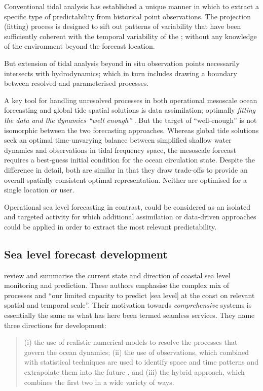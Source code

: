 Conventional tidal analysis has established a unique manner in which to extract a specific type of predictability from historical point observations.
The projection (fitting) process is designed to sift out patterns of variability that have been sufficiently coherent with the temporal variability of the \ATGP{}; without any knowledge of the environment beyond the forecast location.

But extension of tidal analysis beyond in situ observation points necessarily intersects with hydrodynamics; which in turn includes drawing a boundary between resolved and parameterised processes.  

A key tool for handling unresolved processes in both operational mesoscale ocean forecasting and global tide spatial solutions is data assimilation; optimally \textit{fitting the data and the dynamics ``well enough''} \citep{Egbert:1994wz}. 
But the target of ``well-enough'' is not isomorphic between the two forecasting approaches.
Whereas global tide solutions seek an optimal time-unvarying balance between simplified shallow water dynamics and observations in tidal frequency space, the mesoscale forecast requires a best-guess initial condition for the ocean circulation state.  
Despite the difference in detail, both are similar in that they draw trade-offs to provide an overall spatially consistent optimal representation.   Neither are optimised for a single location or user.

Operational sea level forecasting in contrast, could be considered as an isolated and targeted activity for which additional assimilation or data-driven approaches could be applied in order to extract the most relevant predictability. 

\subsection{Sea level forecast development}
\citet{10.3389/fmars.2019.00437} review and summarise the current state and direction of coastal sea level monitoring and prediction.   These authors emphasise the complex mix of processes and ``our limited capacity to predict [sea level] at the coast on relevant spatial and temporal scale''.
Their motivation towards \emph{comprehensive} systems is essentially the same as what has here been termed seamless services. 
They name three directions for development:
\begin{quote}
(i) the use of realistic numerical models to resolve the processes that govern the ocean dynamics; (ii) the use of observations, which combined with statistical techniques are used to identify space and time patterns and extrapolate them into the future , and (iii) the hybrid approach, which combines the first two in a wide variety of ways.
\end{quote} 

